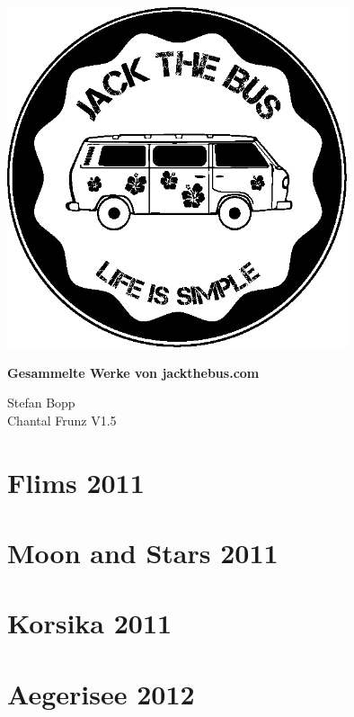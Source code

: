 \documentclass[11pt,nswissgerman]{article}
\begin{document}
\begin{titlepage}
\centering
\includegraphics[width=10cm]{../Bilder/Logo/Logo.png} \\
\vspace{2cm}
{\huge\bfseries Gesammelte Werke von jackthebus.com\par}
\vspace{2cm}
{\Large Stefan Bopp} \\
{\Large Chantal Frunz}
\vfill
{\large V1.5}
\thispagestyle{empty}

\end{titlepage}

\newpage
\lhead{\leftmark}

\cfoot{\thepage}

\tableofcontents
\newpage
\section{Flims 2011}

\newpage
\section{Moon and Stars 2011}

\newpage
\section{Korsika 2011}

\newpage
\section{Aegerisee 2012}

\newpage
\end{document}
